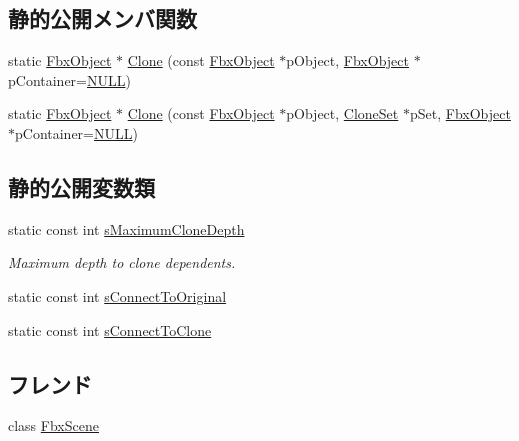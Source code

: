 \subsection*{静的公開メンバ関数}
\begin{DoxyCompactItemize}
\item 
static \hyperlink{class_fbx_object}{Fbx\+Object} $\ast$ \hyperlink{class_fbx_clone_manager_a2fd72cbf71c6dd3105310445c1a7c2b1}{Clone} (const \hyperlink{class_fbx_object}{Fbx\+Object} $\ast$p\+Object, \hyperlink{class_fbx_object}{Fbx\+Object} $\ast$p\+Container=\hyperlink{fbxarch_8h_a070d2ce7b6bb7e5c05602aa8c308d0c4}{N\+U\+LL})
\item 
static \hyperlink{class_fbx_object}{Fbx\+Object} $\ast$ \hyperlink{class_fbx_clone_manager_a00c903de46f38724d4f7fe0d929b9b31}{Clone} (const \hyperlink{class_fbx_object}{Fbx\+Object} $\ast$p\+Object, \hyperlink{class_fbx_clone_manager_aeb8a9c04c9c36eb7e551186a0b18f10d}{Clone\+Set} $\ast$p\+Set, \hyperlink{class_fbx_object}{Fbx\+Object} $\ast$p\+Container=\hyperlink{fbxarch_8h_a070d2ce7b6bb7e5c05602aa8c308d0c4}{N\+U\+LL})
\end{DoxyCompactItemize}
\subsection*{静的公開変数類}
\begin{DoxyCompactItemize}
\item 
static const int \hyperlink{class_fbx_clone_manager_a1844e81f1b96760b4223024b4c133da7}{s\+Maximum\+Clone\+Depth}
\begin{DoxyCompactList}\small\item\em Maximum depth to clone dependents. \end{DoxyCompactList}\item 
static const int \hyperlink{class_fbx_clone_manager_a5a951074ea2c085555fa95b877c56591}{s\+Connect\+To\+Original}
\item 
static const int \hyperlink{class_fbx_clone_manager_ab70c9534523f7e45b21372ff0b2eb109}{s\+Connect\+To\+Clone}
\end{DoxyCompactItemize}
\subsection*{フレンド}
\begin{DoxyCompactItemize}
\item 
class \hyperlink{class_fbx_clone_manager_abcc807c3523609e1c734764de626facc}{Fbx\+Scene}
\end{DoxyCompactItemize}


